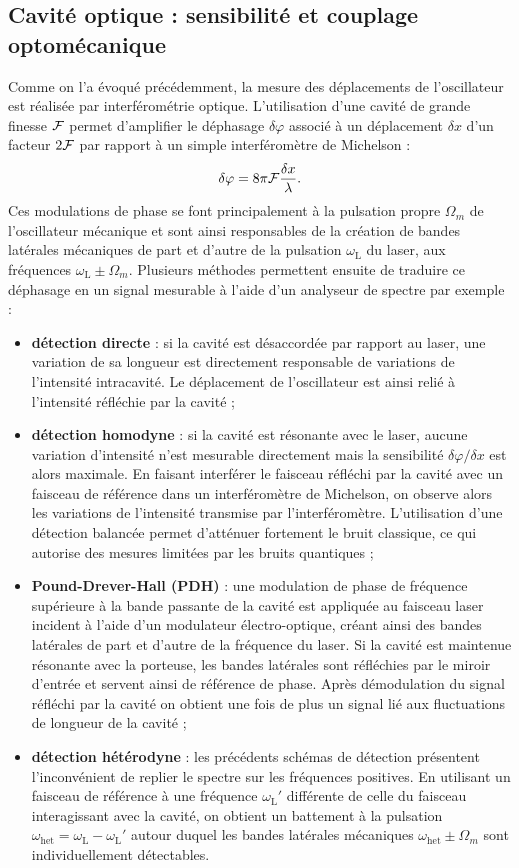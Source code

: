 \documentclass[12pt,a4paper]{article}
\begin{document}
\subsection{Cavité optique : sensibilité et couplage optomécanique}

Comme on l'a évoqué précédemment, la mesure des déplacements de l'oscillateur est réalisée par interférométrie optique.
L'utilisation d'une cavité de grande finesse $\cal{F}$ permet d'amplifier le déphasage $\delta\varphi$ associé à un déplacement $\delta x$ d'un facteur $2\cal{F}$ par rapport à un simple interféromètre de Michelson :
\begin{equation}
\delta \varphi = 8\pi{\cal{F}}\frac{\delta x}{\lambda}.
\end{equation}
Ces modulations de phase se font principalement à la pulsation propre $\Omega_m$ de l'oscillateur mécanique et sont ainsi responsables de la création de bandes latérales mécaniques de part et d'autre de la pulsation $\omega_\mathrm{L}$ du laser, aux fréquences $\omega_\mathrm{L} \pm \Omega_m$.
Plusieurs méthodes permettent ensuite de traduire ce déphasage en un signal mesurable à l'aide d'un analyseur de spectre par exemple :
\begin{itemize}
\item \textbf{détection directe} : si la cavité est désaccordée par rapport au laser, une variation de sa longueur est directement responsable de variations de l'intensité intracavité.
Le déplacement de l'oscillateur est ainsi relié à l'intensité réfléchie par la cavité ;
\item \textbf{détection homodyne} : si la cavité est résonante avec le laser, aucune variation d'intensité n'est mesurable directement mais la sensibilité $\delta\varphi/\delta x$ est alors maximale.
En faisant interférer le faisceau réfléchi par la cavité avec un faisceau de référence dans un interféromètre de Michelson, on observe alors les variations de l'intensité transmise par l'interféromètre.
L'utilisation d'une détection balancée permet d'atténuer fortement le bruit classique, ce qui autorise des mesures limitées par les bruits quantiques ;
\item \textbf{Pound-Drever-Hall (PDH)} : une modulation de phase de fréquence supérieure à la bande passante de la cavité est appliquée au faisceau laser incident à l'aide d'un modulateur électro-optique, créant ainsi des bandes latérales de part et d'autre de la fréquence du laser.
Si la cavité est maintenue résonante avec la porteuse, les bandes latérales sont réfléchies par le miroir d'entrée et servent ainsi de référence de phase.
Après démodulation du signal réfléchi par la cavité on obtient une fois de plus un signal lié aux fluctuations de longueur de la cavité ;
\item \textbf{détection hétérodyne} : les précédents schémas de détection présentent l'inconvénient de replier le spectre sur les fréquences positives.
En utilisant un faisceau de référence à une fréquence $\omega_\mathrm{L}'$ différente de celle du faisceau interagissant avec la cavité, on obtient un battement à la pulsation $\omega_\mathrm{het} = \omega_\mathrm{L} - \omega_\mathrm{L}'$ autour duquel les bandes latérales mécaniques $\omega_\mathrm{het} \pm \Omega_m$ sont individuellement détectables. 
\end{itemize}
\end{document}
